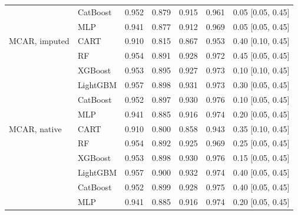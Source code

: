 \begin{table}[p]
\begin{tabular}{@{}llrrrrl@{}}
 & CatBoost & 0.952 & 0.879 & 0.915 & 0.961 & 0.05 [0.05, 0.45] \\
 & MLP & 0.941 & 0.877 & 0.912 & 0.969 & 0.05 [0.05, 0.45] \\
\midrule
MCAR, imputed & CART & 0.910 & 0.815 & 0.867 & 0.953 & 0.40 [0.10, 0.45] \\
 & RF & 0.954 & 0.891 & 0.928 & 0.972 & 0.45 [0.05, 0.45] \\
 & XGBoost & 0.953 & 0.895 & 0.927 & 0.973 & 0.10 [0.10, 0.45] \\
 & LightGBM & 0.957 & 0.898 & 0.931 & 0.973 & 0.30 [0.05, 0.45] \\
 & CatBoost & 0.952 & 0.897 & 0.930 & 0.976 & 0.10 [0.05, 0.45] \\
 & MLP & 0.941 & 0.885 & 0.916 & 0.974 & 0.20 [0.05, 0.45] \\
\midrule
MCAR, native & CART & 0.910 & 0.800 & 0.858 & 0.943 & 0.35 [0.10, 0.45] \\
 & RF & 0.954 & 0.892 & 0.925 & 0.969 & 0.25 [0.05, 0.45] \\
 & XGBoost & 0.953 & 0.898 & 0.930 & 0.976 & 0.15 [0.05, 0.45] \\
 & LightGBM & 0.957 & 0.900 & 0.932 & 0.974 & 0.40 [0.05, 0.45] \\
 & CatBoost & 0.952 & 0.899 & 0.928 & 0.975 & 0.40 [0.05, 0.45] \\
 & MLP & 0.941 & 0.885 & 0.916 & 0.974 & 0.20 [0.05, 0.45] \\
\bottomrule
\end{tabular}
\end{table}

